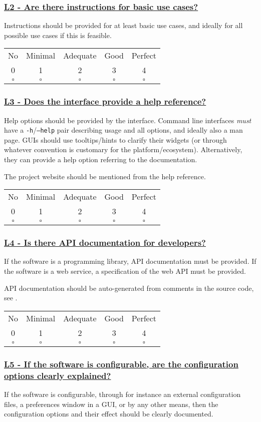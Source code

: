 \documentclass[a4paper,11pt]{article}
\newcommand{\criterion}[2]{\subsubsection*{\underline{#1 - #2}}\label{id:#1}}
\newcommand\CheckTable{%
  \begin{tabular}{ccccc}
    No & Minimal & Adequate & Good & Perfect \\
    0 & 1 & 2 & 3 & 4 \\
    \hline
    $\square$ & $\square$ & $\square$ & $\square$ & $\square$ \\
  \end{tabular}%
}
\newcommand{\refcrit}[1]{%
 \framebox[1.1\width]{\hyperref[id:#1]{#1}}
}
\begin{document}
\newcommand{\lTwoID}{L2}
\newcommand{\lTwoText}{Are there instructions for basic use cases?}
\criterion{\lTwoID}{\lTwoText}

Instructions should be provided for at least basic use cases, and ideally for
all possible use cases if this is feasible.

%
%
%

\CheckTable

\newcommand{\lThreeID}{L3}
\newcommand{\lThreeText}{Does the interface provide a help reference?}
\criterion{\lThreeID}{\lThreeText}

Help options should be provided by the interface. Command line interfaces
\emph{must} have a \texttt{-h}/\texttt{--help} pair describing usage and all
options, and ideally also a man page. GUIs should use tooltips/hints to clarify
their widgets (or through whatever convention is customary for the
platform/ecosystem). Alternatively, they can provide a help option referring to
the documentation.

The project website should be mentioned from the help reference.

\CheckTable

\newcommand{\lFourID}{L4}
\newcommand{\lFourText}{Is there API documentation for developers?}
\criterion{\lFourID}{\lFourText}

If the software is a programming library, API documentation must be provided.
If the software is a web service, a specification of the web API must be provided. 

API documentation should be auto-generated from comments in the source code,
see \refcrit{AN3}.

\CheckTable

\newcommand{\lFiveID}{L5}
\newcommand{\lFiveText}{If the software is configurable, are the configuration options clearly explained?}
\criterion{\lFiveID}{\lFiveText}

%
%

If the software is configurable, through for instance an external configuration
files, a preferences window in a GUI, or by any other means, then the
configuration options and their effect should be clearly documented.
\end{document}
